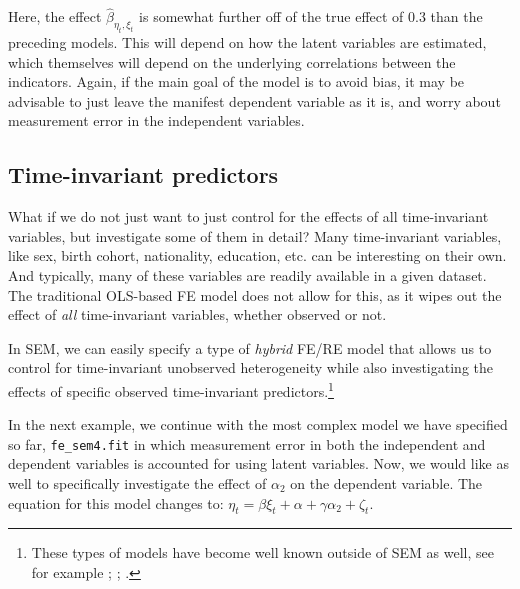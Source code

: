 \documentclass[]{interact}
\theoremstyle{plain}%
\theoremstyle{definition}
\theoremstyle{remark}
\begin{document}
\doublespacing

Here, the effect \(\hat{\beta}_{\eta_{t},\xi_{t}}\) is somewhat further
off of the true effect of 0.3 than the preceding models. This will
depend on how the latent variables are estimated, which themselves will
depend on the underlying correlations between the indicators. Again, if
the main goal of the model is to avoid bias, it may be advisable to just
leave the manifest dependent variable as it is, and worry about
measurement error in the independent variables.

\hypertarget{time-invariant-predictors}{%
\subsection{Time-invariant predictors}\label{time-invariant-predictors}}

What if we do not just want to just control for the effects of all
time-invariant variables, but investigate some of them in detail? Many
time-invariant variables, like sex, birth cohort, nationality,
education, etc. can be interesting on their own. And typically, many of
these variables are readily available in a given dataset. The
traditional OLS-based FE model does not allow for this, as it wipes out
the effect of \emph{all} time-invariant variables, whether observed or
not.

In SEM, we can easily specify a type of \emph{hybrid} FE/RE model
\citep{Bollen2010} that allows us to control for time-invariant
unobserved heterogeneity while also investigating the effects of
specific observed time-invariant predictors.\footnote{These types of
  models have become well known outside of SEM as well, see for example
  \citet{Allison2011}; \citet{Schunck2013}; \citet{Bell2018}.}

In the next example, we continue with the most complex model we have
specified so far, \texttt{fe\_sem4.fit} in which measurement error in
both the independent and dependent variables is accounted for using
latent variables. Now, we would like as well to specifically investigate
the effect of \(\alpha_{2}\) on the dependent variable. The equation for
this model changes to:
\(\eta_{t} = \beta \xi_{t} + \alpha + \gamma \alpha_{2} + \zeta_{t}\).

\singlespacing
\end{document}
